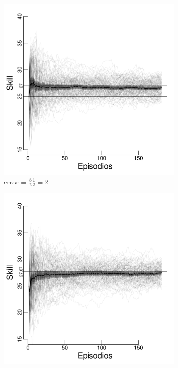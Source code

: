 \documentclass[a4paper,11pt]{book}
\theoremstyle{definition}
\begin{document}
 \begin{figure}[H]
\centering
  \begin{subfigure}[t]{0.32\textwidth}
  \includegraphics[page=1,width=\textwidth]{static/truesynergy/expF2.pdf}
  \caption{\scriptsize error = $\frac{8}{2}\frac{1}{2} = 2$}\label{F2}
  \end{subfigure}
  \begin{subfigure}[t]{0.32\textwidth}
  \includegraphics[page=2,width=\textwidth]{static/truesynergy/expF4.pdf}

\end{subfigure}
\end{figure}
\end{document}
